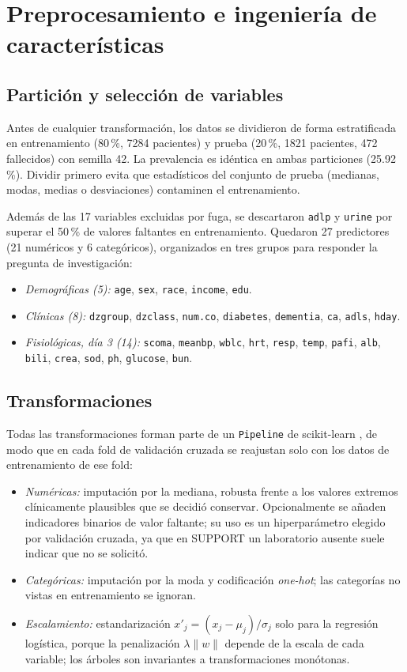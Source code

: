 \documentclass[conference]{IEEEtran}
\begin{document}
\section{Preprocesamiento e ingeniería de características}
\label{sec:prepro}

\subsection{Partición y selección de variables}
Antes de cualquier transformación, los datos se dividieron de forma estratificada en entrenamiento (80\,\%, 7284 pacientes) y prueba (20\,\%, 1821 pacientes, 472 fallecidos) con semilla 42. La prevalencia es idéntica en ambas particiones (25.92\,\%). Dividir primero evita que estadísticos del conjunto de prueba (medianas, modas, medias o desviaciones) contaminen el entrenamiento.

Además de las 17 variables excluidas por fuga, se descartaron \texttt{adlp} y \texttt{urine} por superar el 50\,\% de valores faltantes en entrenamiento. Quedaron 27 predictores (21 numéricos y 6 categóricos), organizados en tres grupos para responder la pregunta de investigación:
\begin{itemize}
\item \textit{Demográficas (5):} \texttt{age}, \texttt{sex}, \texttt{race}, \texttt{income}, \texttt{edu}.
\item \textit{Clínicas (8):} \texttt{dzgroup}, \texttt{dzclass}, \texttt{num.co}, \texttt{diabetes}, \texttt{dementia}, \texttt{ca}, \texttt{adls}, \texttt{hday}.
\item \textit{Fisiológicas, día 3 (14):} \texttt{scoma}, \texttt{meanbp}, \texttt{wblc}, \texttt{hrt}, \texttt{resp}, \texttt{temp}, \texttt{pafi}, \texttt{alb}, \texttt{bili}, \texttt{crea}, \texttt{sod}, \texttt{ph}, \texttt{glucose}, \texttt{bun}.
\end{itemize}

\subsection{Transformaciones}
Todas las transformaciones forman parte de un \texttt{Pipeline} de scikit-learn \cite{pedregosa2011}, de modo que en cada fold de validación cruzada se reajustan solo con los datos de entrenamiento de ese fold:
\begin{itemize}
\item \textit{Numéricas:} imputación por la mediana, robusta frente a los valores extremos clínicamente plausibles que se decidió conservar. Opcionalmente se añaden indicadores binarios de valor faltante; su uso es un hiperparámetro elegido por validación cruzada, ya que en SUPPORT un laboratorio ausente suele indicar que no se solicitó.
\item \textit{Categóricas:} imputación por la moda y codificación \textit{one-hot}; las categorías no vistas en entrenamiento se ignoran.
\item \textit{Escalamiento:} estandarización $x'_j=(x_j-\mu_j)/\sigma_j$ solo para la regresión logística, porque la penalización $\lambda\lVert w\rVert$ depende de la escala de cada variable; los árboles son invariantes a transformaciones monótonas.
\end{itemize}
\end{document}
